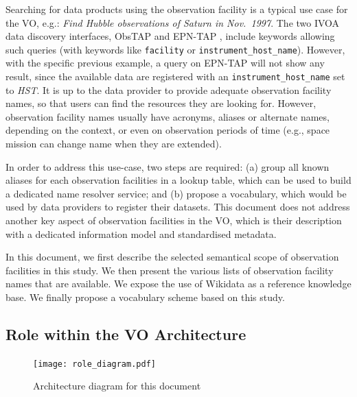 \documentclass[11pt,a4paper]{ivoa}
\begin{document}
Searching for data products using the observation facility is a 
typical use case for the VO, e.g.: \emph{Find Hubble observations
of Saturn in Nov.\ 1997}. The two IVOA data discovery interfaces, 
ObsTAP \citep{2017ivoa.spec.0509L} and EPN-TAP \citep{ivoa:epntap}, 
include keywords allowing such queries (with keywords like 
\texttt{facility} or \texttt{instrument\_host\_name}). However, with 
the specific previous example, a query on EPN-TAP will not show any 
result, since the available data are registered with an 
\texttt{instrument\_host\_name} set to \emph{HST}. It is up to the 
data provider to provide adequate observation facility names, so 
that users can find the resources they are looking for. However, 
observation facility names usually have acronyms, aliases or alternate 
names, depending on the context, or even on observation periods of 
time (e.g., space mission can change name when they are extended). 

In order to address this use-case, two steps are required: (a) group
all known aliases for each observation facilities in a lookup table, 
which can be used to build a dedicated name resolver service; and 
(b) propose a vocabulary, which would be used by data providers to 
register their datasets. This document does not address another key
aspect of observation facilities in the VO, which is their 
description with a dedicated information model and standardised 
metadata.

In this document, we first describe the selected semantical scope of 
observation facilities in this study. We then present the various 
lists of observation facility names that are available. We expose the 
use of Wikidata as a reference knowledge base. We finally propose a 
vocabulary scheme based on this study. 

\subsection{Role within the VO Architecture}

\begin{figure}
\centering


\texttt{[image: role\_diagram.pdf]}
\caption{Architecture diagram for this document}
\label{fig:archdiag}
\end{figure}
\end{document}
